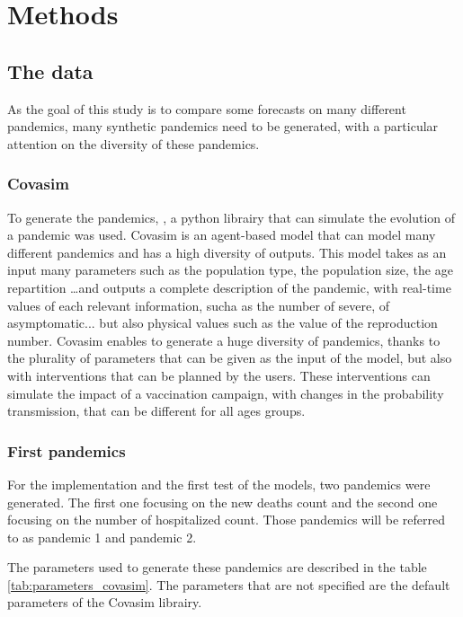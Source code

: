 \section{Methods}

\subsection*{The data}

As the goal of this study is to compare some forecasts on many different pandemics, many synthetic pandemics need to be generated, with a particular attention on the diversity of these pandemics. 

\subsubsection*{Covasim}

To generate the pandemics,  \cite{kerr2021covasim}, a python librairy that can simulate the evolution of a pandemic was used. 
Covasim is an agent-based model that can model many different pandemics and has a high diversity of outputs. 
This model takes as an input many parameters such as the population type, the population size, the age repartition \dots and outputs a complete description of the pandemic, with real-time values of each relevant information, sucha as the number of severe, of asymptomatic... but also physical values such as the value of the reproduction number. 
Covasim enables to generate a huge diversity of pandemics, thanks to the plurality of parameters that can be given as the input of the model, but also with interventions that can be planned by the users. 
These interventions can simulate the impact of a vaccination campaign, with changes in the probability transmission, that can be different for all ages groups. 

\subsubsection{First pandemics}

For the implementation and the first test of the models, two pandemics were generated. 
The first one focusing on the new deaths count and the second one focusing on the number of hospitalized count. 
Those pandemics will be referred to as pandemic 1 and pandemic 2. 



The parameters used to generate these pandemics are described in the table \ref{tab:parameters_covasim}.
The parameters that are not specified are the default parameters of the Covasim librairy. 


